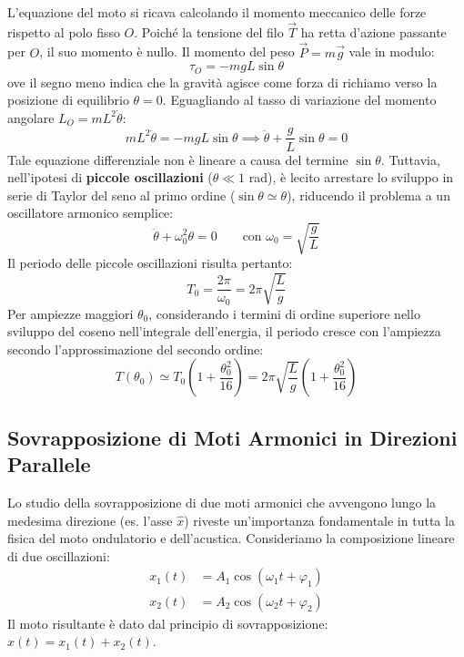 L'equazione del moto si ricava calcolando il momento meccanico delle forze rispetto al polo fisso $O$. Poiché la tensione del filo $\vec{T}$ ha retta d'azione passante per $O$, il suo momento è nullo. Il momento del peso $\vec{P} = m\vec{g}$ vale in modulo:
\begin{equation}
    \tau_O = -mgL\sin\theta
\end{equation}
ove il segno meno indica che la gravità agisce come forza di richiamo verso la posizione di equilibrio $\theta = 0$. Eguagliando al tasso di variazione del momento angolare $L_O = mL^2\dot{\theta}$:
\begin{equation}
    mL^2\ddot{\theta} = -mgL\sin\theta \implies \ddot{\theta} + \frac{g}{L}\sin\theta = 0
\end{equation}
Tale equazione differenziale non è lineare a causa del termine $\sin\theta$. Tuttavia, nell'ipotesi di \textbf{piccole oscillazioni} ($\theta \ll 1$ rad), è lecito arrestare lo sviluppo in serie di Taylor del seno al primo ordine ($\sin\theta \simeq \theta$), riducendo il problema a un oscillatore armonico semplice:
\begin{equation}
    \ddot{\theta} + \omega_0^2 \theta = 0 \qquad \text{con } \omega_0 = \sqrt{\frac{g}{L}}
\end{equation}
Il periodo delle piccole oscillazioni risulta pertanto:
\begin{equation}
    T_0 = \frac{2\pi}{\omega_0} = 2\pi\sqrt{\frac{L}{g}}
\end{equation}
Per ampiezze maggiori $\theta_0$, considerando i termini di ordine superiore nello sviluppo del coseno nell'integrale dell'energia, il periodo cresce con l'ampiezza secondo l'approssimazione del secondo ordine:
\begin{equation}
    T(\theta_0) \simeq T_0 \left( 1 + \frac{\theta_0^2}{16} \right) = 2\pi\sqrt{\frac{L}{g}} \left( 1 + \frac{\theta_0^2}{16} \right)
\end{equation}

\subsection{Sovrapposizione di Moti Armonici in Direzioni Parallele}
Lo studio della sovrapposizione di due moti armonici che avvengono lungo la medesima direzione (es. l'asse $\hat{x}$) riveste un'importanza fondamentale in tutta la fisica del moto ondulatorio e dell'acustica. Consideriamo la composizione lineare di due oscillazioni:
\begin{align*}
x_1(t) &= A_1 \cos(\omega_1 t + \varphi_1) \\
x_2(t) &= A_2 \cos(\omega_2 t + \varphi_2)
\end{align*}
Il moto risultante è dato dal principio di sovrapposizione: $x(t) = x_1(t) + x_2(t)$.

